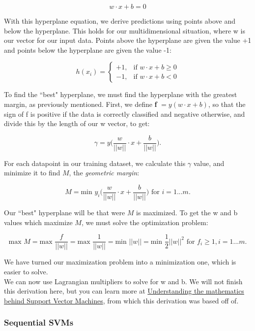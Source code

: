 \documentclass{article}
\begin{document}
\[w \cdot x + b = 0 \]

With this hyperplane equation, we derive predictions using points above and below the hyperplane. This holds for our multidimensional situation, where w is our vector for our input data. Points above the hyperplane are given the value +1 and points below the hyperplane are given the value -1:

$$
h(x_i) =
\begin{cases}
    +1,& \text{if } w \cdot x + b \geq 0 \\
    -1,& \text{if } w \cdot x + b < 0
\end{cases}
$$

To find the ``best" hyperplane, we must find the hyperplane with the greatest margin, as previously mentioned. First, we define \textbf{f} $ = y(w \cdot x + b)$, so that the sign of f is positive if the data is correctly classified and negative otherwise, and divide this by the length of our w vector, to get:

\[ \gamma = y\bigg(\frac{w}{||w||}\cdot x + \frac{b}{||w||} \bigg) \text{.} \]

For each datapoint in our training dataset, we calculate this $\gamma$ value, and minimize it to find $M$, the \textit{geometric margin}:

\[ M = \text{min } y_i \bigg( \frac{w}{||w||} \cdot x + \frac{b}{||w||} \bigg) \text{   for } i=1...m \text{.} \]

Our ``best" hyperplane will be that were $M$ is maximized. To get the w and b values which maximize $M$, we must solve the optimization problem:

\[ \text{max } M = \text{max } \frac{f}{||w||} = \text{max } \frac{1}{||w||} = \text{min } ||w|| = \text{min } \frac{1}{2}||w||^2 \text{   for } f_i \geq 1, i=1...m \text{.} \]

We have turned our maximization problem into a minimization one, which is easier to solve. \\

We can now use Lagrangian multipliers to solve for w and b. We will not finish this derivation here, but you can learn more at \href{https://shuzhanfan.github.io/2018/05/understanding-mathematics-behind-support-vector-machines/}{Understanding the mathematics behind Support Vector Machines}, from which this derivation was based off of.

\subsubsection{Sequential SVMs}
\label{sec:sequencing}
\end{document}
